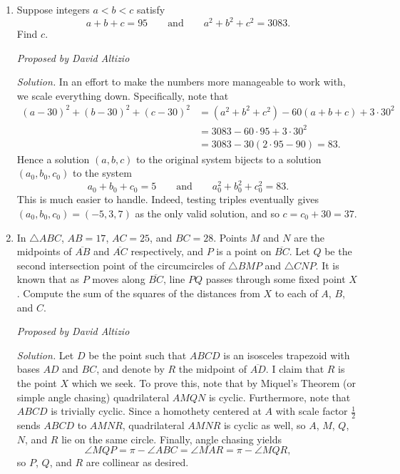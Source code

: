 \documentclass[10pt]{article}
\newcommand{\proposed}[1]
{
\vspace{5pt}
\noindent\textit{Proposed by #1}
}
\newcommand{\solution}
{
\vspace{5pt}
\noindent\textit{Solution.}\qquad
}
\begin{document}
\begin{enumerate}
\par The rest is a matter of arithmetic and bookkeeping.  Note that \[\dfrac{10^5}{12\cdot 13}=\dfrac{25000}{39}=641+\frac{1}{39}.\] As a result, we know $100000\equiv 4\pmod{156}$.  Hence the only integers we have to check by hand are $n=0,1,2,3,4$, and we can clearly see that out of those only $n=3$ yields an extra solution to the congruence.  This means that the final answer to the problem is $12\cdot 641+1=\boxed{7693}$.

\item Suppose integers $a < b < c$ satisfy \[ a + b + c = 95\qquad\text{and}\qquad a^2 + b^2 + c^2 = 3083.\] Find $c$.

\proposed{David Altizio}

\solution In an effort to make the numbers more manageable to work with, we scale everything down.  Specifically, note that \begin{align*}(a-30)^2+(b-30)^2+(c-30)^2&=(a^2+b^2+c^2)-60(a+b+c)+3\cdot 30^2\\&=3083 - 60\cdot 95 + 3\cdot 30^2\\&=3083 - 30 (2\cdot 95 - 90) = 83.\end{align*} Hence a solution $(a,b,c)$ to the original system bijects to a solution $(a_0,b_0,c_0)$ to the system \[a_0+b_0+c_0=5\qquad\text{and}\qquad a_0^2+b_0^2+c_0^2=83.\] This is much easier to handle.  Indeed, testing triples eventually gives $(a_0,b_0,c_0)=(-5,3,7)$ as the only valid solution, and so $c=c_0+30=\boxed{37}$.

\item In $\triangle ABC$, $AB=17$, $AC=25$, and $BC=28$.  Points $M$ and $N$ are the midpoints of $\overline{AB}$ and $\overline{AC}$ respectively, and $P$ is a point on $\overline{BC}$.  Let $Q$ be the second intersection point of the circumcircles of $\triangle BMP$ and $\triangle CNP$.  It is known that as $P$ moves along $\overline{BC}$, line $PQ$ passes through some fixed point $X$.  Compute the sum of the squares of the distances from $X$ to each of $A$, $B$, and $C$. %

\proposed{David Altizio}

\solution Let $D$ be the point such that $ABCD$ is an isosceles trapezoid with bases $AD$ and $BC$, and denote by $R$ the midpoint of $\overline{AD}$.  I claim that $R$ is the point $X$ which we seek.  To prove this, note that by Miquel's Theorem (or simple angle chasing) quadrilateral $AMQN$ is cyclic.  Furthermore, note that $ABCD$ is trivially cyclic.  Since a homothety centered at $A$ with scale factor $\tfrac12$ sends $ABCD$ to $AMNR$, quadrilateral $AMNR$ is cyclic as well, so $A$, $M$, $Q$, $N$, and $R$ lie on the same circle.  Finally, angle chasing yields \[\angle MQP=\pi-\angle ABC =\angle MAR = \pi - \angle MQR,\] so $P$, $Q$, and $R$ are collinear as desired.


\end{enumerate}
\end{document}
